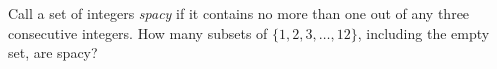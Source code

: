 Call a set of integers \emph{spacy} if it contains no more than one out of any three consecutive integers. How many subsets of $\{1,2,3,\dots,12\}$, including the empty set, are spacy?
